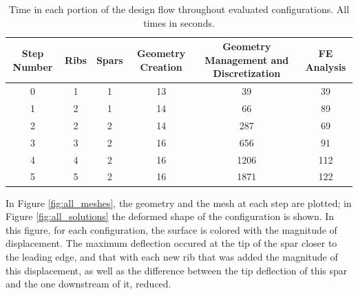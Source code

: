 \documentclass[conf]{new-aiaa}
\begin{document}
\begin{table}[H]
  \centering
  \caption{
    Time in each portion of the design flow throughout 
    evaluated configurations. All times in seconds.}
  \begin{tabular}{| c | c | c | c | c | c |}
    \hline
    Step Number & Ribs  & Spars & Geometry Creation & Geometry Management and Discretization & FE Analysis\\
    \hline
    0 & 1 &  1        & 13 & 39 & 39    \\
    1 & 2 &  1        & 14 & 66 & 89    \\
    2 & 2 &  2        & 14 & 287 & 69   \\
    3 & 3 &  2        & 16 & 656 & 91   \\
    4 & 4 &  2        & 16 & 1206 & 112 \\
    5 & 5 &  2        & 16 & 1871 & 122 \\
    \hline
  \end{tabular}
  \label{tab:solution_time_breakdown}
\end{table}

In Figure \ref{fig:all_meshes}, 
the geometry and the mesh at each step are plotted;
in Figure \ref{fig:all_solutions}
the deformed shape of the configuration is shown.
In this figure, for each configuration, 
the surface is colored with the magnitude of displacement.
The maximum deflection occured at the tip of the spar closer to the leading edge, 
and that with each new rib that was added the magnitude of this displacement, 
as well as the difference between the tip deflection of this spar 
and the one downstream of it, reduced. 
\end{document}
